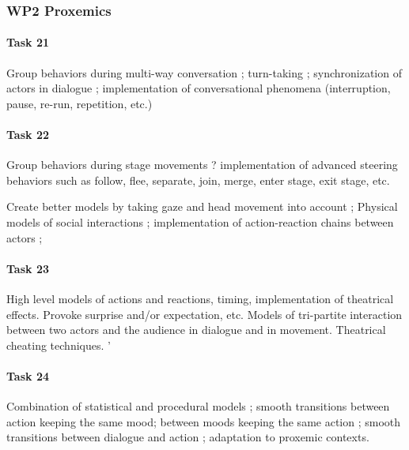 
\subsubsection{WP2 Proxemics}

\paragraph{Task 21} Group behaviors during multi-way conversation ; turn-taking ; synchronization of actors in dialogue ; implementation of conversational phenomena (interruption, pause, re-run, repetition, etc.)

\paragraph{Task 22} Group behaviors during stage movements ? implementation of advanced steering behaviors  such as follow, flee, separate, join, merge, enter stage, exit stage, etc. 

Create better models by taking gaze and head movement into account ; Physical models of social interactions ; implementation of action-reaction chains between actors ; 

\paragraph{Task 23} High level models of actions and reactions, timing, implementation of theatrical effects. Provoke surprise and/or expectation, etc. Models of tri-partite interaction between two actors and the audience in dialogue and in movement. Theatrical cheating techniques. '

\paragraph{Task 24}  Combination of statistical and procedural models ; smooth transitions between action keeping the same mood; between moods keeping the same action ; smooth transitions between dialogue and action ; adaptation to proxemic contexts.

\endinput
